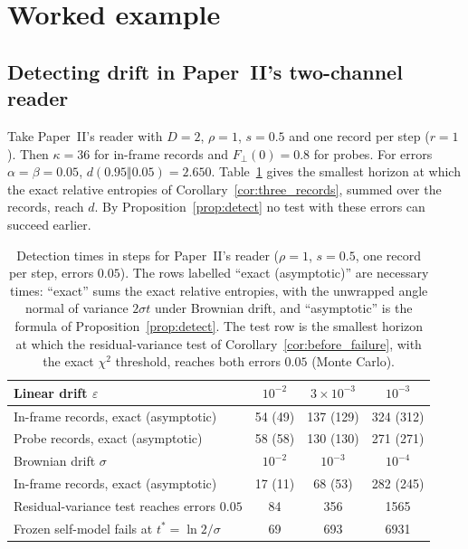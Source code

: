 \documentclass[12pt]{article}
\theoremstyle{definition}
\begin{document}
\appendix

\section{Worked example}
\label{sec:example}

\subsection{Detecting drift in Paper~II's two-channel reader}
\label{subsec:example_detect}

Take Paper~II's reader with $D=2$, $\rho=1$, $s=0.5$ and one record per step ($r=1$). Then $\kappa=36$ for in-frame records and $F_\perp(0)=0.8$ for probes. For errors $\alpha=\beta=0.05$, $d(0.95\Vert0.05)=2.650$. Table~\ref{tab:detect} gives the smallest horizon at which the exact relative entropies of Corollary~\ref{cor:three_records}, summed over the records, reach $d$. By Proposition~\ref{prop:detect} no test with these errors can succeed earlier.

\begin{table}[t]
\centering
\small
\begin{tabular}{lccc}
\toprule
Linear drift $\varepsilon$ & $10^{-2}$ & $3\times10^{-3}$ & $10^{-3}$\\
\midrule
In-frame records, exact (asymptotic) & 54 (49) & 137 (129) & 324 (312)\\
Probe records, exact (asymptotic) & 58 (58) & 130 (130) & 271 (271)\\
\midrule
Brownian drift $\sigma$ & $10^{-2}$ & $10^{-3}$ & $10^{-4}$\\
\midrule
In-frame records, exact (asymptotic) & 17 (11) & 68 (53) & 282 (245)\\
Residual-variance test reaches errors $0.05$ & 84 & 356 & 1565\\
Frozen self-model fails at $t^*=\ln2/\sigma$ & 69 & 693 & 6931\\
\bottomrule
\end{tabular}
\caption{Detection times in steps for Paper~II's reader ($\rho=1$, $s=0.5$, one record per step, errors $0.05$). The rows labelled ``exact (asymptotic)'' are necessary times: ``exact'' sums the exact relative entropies, with the unwrapped angle normal of variance $2\sigma t$ under Brownian drift, and ``asymptotic'' is the formula of Proposition~\ref{prop:detect}. The test row is the smallest horizon at which the residual-variance test of Corollary~\ref{cor:before_failure}, with the exact $\chi^2$ threshold, reaches both errors $0.05$ (Monte Carlo).}
\label{tab:detect}
\end{table}
\end{document}
